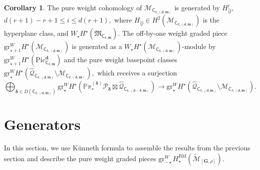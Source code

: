 \documentclass[12pt,reqno]{amsart}
\theoremstyle{definition}
\theoremstyle{definition}
\theoremstyle{definition}
\theoremstyle{definition}
\newtheorem{corollary}[theorem]{Corollary}
\newcommand{\Mtil}{\widetilde{\mathcal{M}}}
\newcommand{\gr}{\mathrm{gr}}
\begin{document}
\begin{corollary}\label{cor:Mcycle}
  The pure weight cohomology of $\mathcal{M}_{\mathsf{C}_{k, (\mathbf{d}, \mathbf{m})}}$ is generated by $H_{\hat{\mathcal{Q}}}^i,$ $d(r+1)-r+1\leq i\leq d(r+1),$ where $H_{\hat{\mathcal{Q}}}\in H^2(\mathcal{M}_{\mathsf{C}_{k, (\mathbf{d}, \mathbf{m})}})$ is the hyperplane class, and $W_\star H^\star(\mathfrak{M}_{\mathsf{C}_{k, \mathbf{m}}}).$ The off-by-one weight graded piece $\mathrm{gr}^W_{\star+1}H^\star(\mathcal{M}_{\mathsf{C}_{k, (\mathbf{d}, \mathbf{m})}})$ is generated as a $W_\star H^\star(\mathcal{M}_{\mathsf{C}_{k, (\mathbf{d}, \mathbf{m})}})$-module by $\mathrm{gr}^W_{\star + 1}H^\star(\mathrm{Pic}^{\mathbf{d}}_{\mathsf{C}_{k, \mathbf{m}}})$ and the pure weight basepoint classes $\mathrm{gr}^W_\star H^\star(\hat{\mathcal{Q}}_{\mathsf{C}_{k, (\mathbf{d}, \mathbf{m})}}\setminus \mathcal{M}_{\mathsf{C}_{k, (\mathbf{d}, \mathbf{m})}}),$ which receives a surjection $$\bigoplus_{\boldsymbol{\delta}\in D(\mathsf{C}_{k, (\mathbf{d}, \mathbf{m})})} \mathrm{gr}^W_\star H^\star(\mathbb{P}\pi^{(\boldsymbol{\delta})}_* \mathcal{P}_{\boldsymbol{\delta}}\boxtimes \hat{\mathcal{Q}}_{\mathsf{C}_{k, (\mathbf{d}-\boldsymbol{\delta}, \mathbf{m})}})\to \mathrm{gr}^W_\star H^\star(\hat{\mathcal{Q}}_{\mathsf{C}_{k, (\mathbf{d}, \mathbf{m})}}\setminus \mathcal{M}_{\mathsf{C}_{k, (\mathbf{d}, \mathbf{m})}}).$$
\end{corollary}

\section{Generators}
In this section, we use Künneth formula to assemble the results from the previous section and describe the pure weight graded pieces $\gr^{W}_{-\star}H_\star^{\mathrm{BM}}(\Mtil_{[\mathbf{G},\rho]}).$
\end{document}
